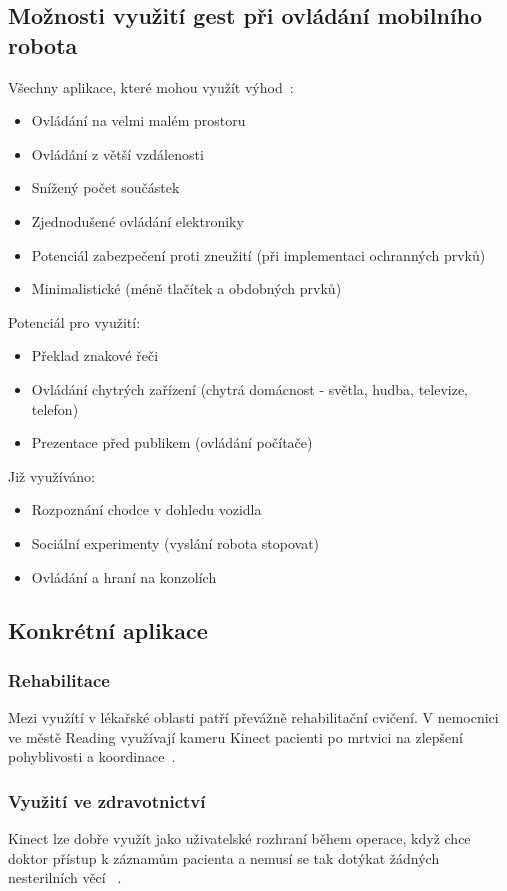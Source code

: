 \subsection{Možnosti využití gest při ovládání mobilního robota}
Všechny aplikace, které mohou využít výhod~\cite{14}:
\begin{itemize}
\item Ovládání na velmi malém prostoru
\item Ovládání z větší vzdálenosti
\item Snížený počet součástek
\item Zjednodušené ovládání elektroniky
\item Potenciál zabezpečení proti zneužití (při implementaci ochranných prvků)
\item Minimalistické (méně tlačítek a obdobných prvků)\\
\end{itemize}
Potenciál pro využití:
\begin{itemize}
\item Překlad znakové řeči
\item Ovládání chytrých zařízení (chytrá domácnost - světla, hudba, televize, telefon)
\item Prezentace před publikem (ovládání počítače)
\\
\end{itemize}
Již využíváno:
\begin{itemize}
\item Rozpoznání chodce v dohledu vozidla
\item Sociální experimenty (vyslání robota stopovat)
\item Ovládání a hraní na konzolích
\end{itemize}

\subsection{Konkrétní aplikace}
\subsubsection{Rehabilitace}
Mezi využítí v lékařské oblasti patří převážně rehabilitační cvičení. V nemocnici ve městě Reading využívají kameru Kinect pacienti po mrtvici na zlepšení pohyblivosti a koordinace~\cite{21}. 

\subsubsection{Využití ve zdravotnictví}
Kinect lze dobře využít jako uživatelské rozhraní během operace, když chce doktor přístup k záznamům pacienta a nemusí se tak dotýkat žádných nesterilních věcí ~\cite{24}.\\

